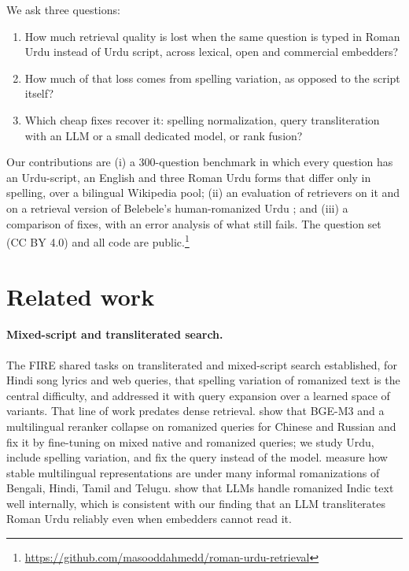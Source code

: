 \documentclass[11pt]{article}
\begin{document}
We ask three questions:
\begin{enumerate}
\item How much retrieval quality is lost when the same question is typed in Roman Urdu instead of Urdu script, across lexical, open and commercial embedders?
\item How much of that loss comes from spelling variation, as opposed to the script itself?
\item Which cheap fixes recover it: spelling normalization, query transliteration with an LLM or a small dedicated model, or rank fusion?
\end{enumerate}

Our contributions are (i) a 300-question benchmark in which every question has an Urdu-script, an English and three Roman Urdu forms that differ only in spelling, over a bilingual Wikipedia pool; (ii) an evaluation of \NRetrievers{} retrievers on it and on a retrieval version of Belebele's human-romanized Urdu \citep{bandarkar2024belebele}; and (iii) a comparison of fixes, with an error analysis of what still fails. The question set (CC BY 4.0) and all code are public.\footnote{\url{https://github.com/masooddahmedd/roman-urdu-retrieval}}

\section{Related work}

\paragraph{Mixed-script and transliterated search.} The FIRE shared tasks on transliterated and mixed-script search \citep{saharoy2013fire,banerjee2020msir} established, for Hindi song lyrics and web queries, that spelling variation of romanized text is the central difficulty, and \citet{gupta2014msir} addressed it with query expansion over a learned space of variants. That line of work predates dense retrieval. \citet{chari2025lost} show that BGE-M3 and a multilingual reranker collapse on romanized queries for Chinese and Russian and fix it by fine-tuning on mixed native and romanized queries; we study Urdu, include spelling variation, and fix the query instead of the model. \citet{singh2026romanizations} measure how stable multilingual representations are under many informal romanizations of Bengali, Hindi, Tamil and Telugu. \citet{husain2024romansetu} show that LLMs handle romanized Indic text well internally, which is consistent with our finding that an LLM transliterates Roman Urdu reliably even when embedders cannot read it.
\end{document}
